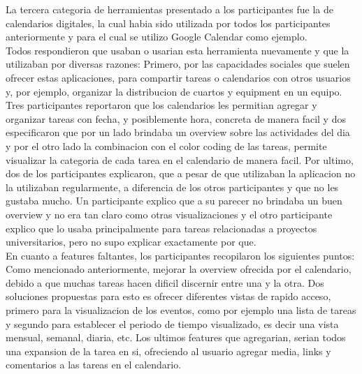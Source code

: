La tercera categoria de herramientas presentado a los participantes fue la de calendarios digitales, la cual habia sido utilizada por todos los participantes anteriormente y para el cual se utilizo Google Calendar como ejemplo.\\
Todos respondieron que usaban o usarian esta herramienta nuevamente y que la utilizaban por diversas razones: Primero, por las capacidades sociales que suelen ofrecer estas aplicaciones, para compartir tareas o calendarios con otros usuarios y, por ejemplo, organizar la distribucion de cuartos y equipment en un equipo. Tres participantes reportaron que los calendarios les permitian agregar y organizar tareas con fecha, y posiblemente hora, concreta de manera facil y dos especificaron que por un lado brindaba un overview sobre las actividades del dia y por el otro lado la combinacion con el color coding de las tareas, permite visualizar la categoria de cada tarea en el calendario de manera facil. Por ultimo, dos de los participantes explicaron, que a pesar de que utilizaban la aplicacion no la utilizaban regularmente, a diferencia de los otros participantes y que no les gustaba mucho. Un participante explico que a su parecer no brindaba un buen overview y no era tan claro como otras visualizaciones y el otro participante explico que lo usaba principalmente para tareas relacionadas a proyectos universitarios, pero no supo explicar exactamente por que. \\
En cuanto a features faltantes, los participantes recopilaron los siguientes puntos: Como mencionado anteriormente, mejorar la overview ofrecida por el calendario, debido a que muchas tareas hacen dificil discernir entre una y la otra. Dos soluciones propuestas para esto es ofrecer diferentes vistas de rapido acceso, primero para la visualizacion de los eventos, como por ejemplo una lista de tareas y segundo para establecer el periodo de tiempo visualizado, es decir una vista mensual, semanal, diaria, etc. Los ultimos features que agregarian, serian todos una expansion de la tarea en si, ofreciendo al usuario agregar media, links y comentarios a las tareas en el calendario. \\
